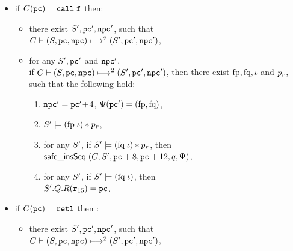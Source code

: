 \begin{definition}
\begin{itemize}
        \item if $\code (\pc) = \call \; \lab{}$ then:
		\begin{itemize}
			\item there exist $\state', \pc', \npc'$, such that
			\\
			$\multiptrans{2}{(\state, \pc, \npc)}
				{(\state', \pc', \npc')}$,
			
			\item for any $\state', \pc'$ and $\npc'$, \\ 
			if
			$\multiptrans{2}{(\state, \pc, \npc)}{(\state', \pc', \npc')}$,
			then there exist $\specpre, \specpost, \lgvl$ and $\pr$,
			such that the following hold:
            \begin{enumerate}[(1)]
                \item $\npc' = \pc'\!+\!4$,
                      $\Cspec(\pc') = (\specpre, \specpost)$,
				
				
				\item $\asrtmodel{\state'}{(\specpre \; \lgvl) * \pr}$,
				
				\item
				for any $\state'$, if $\asrtmodel{\state'}{(\specpost \; \lgvl) * \pr}$,
				then \\ 
				$\safetins \; (\code, \state', \pc+8, \pc+12, \astQ, \Psi)$,
				
				\item
				for any $\state'$, if $\asrtmodel{\state'}{(\specpost \; \lgvl)}$,
				then \\ 
				$\state'.\Rstate.\RFile(\reg{15}) = \pc$.
            \end{enumerate}
		\end{itemize}
		
		\item if $\code(\pc) = \retl$ then :
		\begin{itemize}
			\item there exist $\state', \pc', \npc'$, such that
			\\
			$\multiptrans{2}{(\state, \pc, \npc)}
				{(\state', \pc', \npc')}$,
			

\end{itemize}
\end{itemize}
\end{definition}
